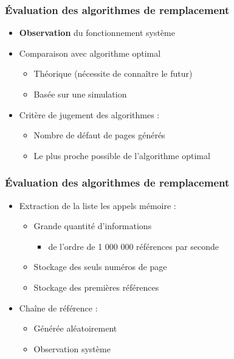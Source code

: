 \begin{frame}
\frametitle{Évaluation des algorithmes de remplacement}
\begin{itemize}
\item \textbf{Observation} du fonctionnement système
\item Comparaison avec algorithme optimal
\begin{itemize}
\item Théorique (nécessite de connaître le futur)
\item Basée sur une simulation
\end{itemize}
\item Critère de jugement des algorithmes :
\begin{itemize}
\item Nombre de défaut de pages générés
\item Le plus proche possible de l'algorithme optimal
\end{itemize}
\end{itemize}
\end{frame}


\begin{frame}
\frametitle{Évaluation des algorithmes de remplacement}
\begin{itemize}
\item Extraction de la liste les appels mémoire :
\begin{itemize}
\item Grande quantité d'informations
\begin{itemize}
\item de l'ordre de 1 000 000 références par seconde
\end{itemize}
\item Stockage des seuls numéros de page
\item Stockage des premières références
\end{itemize}
\item Chaîne de référence :
\begin{itemize}
\item Générée aléatoirement
\item Observation système
\end{itemize}
\end{itemize}
\end{frame}


